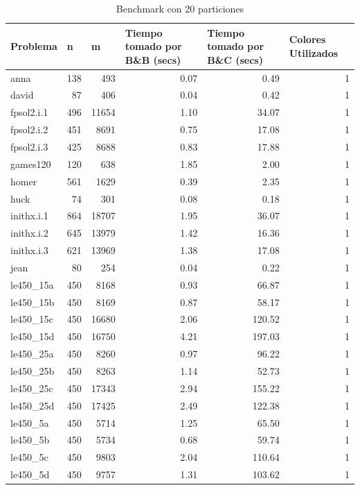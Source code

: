 \begin{table}[H]
\centering
\caption{Benchmark con 20 particiones}
\begin{tabular}{|l|r|r|r|r|r|}
\hline
Problema & \multicolumn{1}{l|}{n} & \multicolumn{1}{l|}{m} & \multicolumn{1}{l|}{Tiempo tomado por B\&B (secs)} & \multicolumn{1}{l|}{Tiempo tomado por B\&C (secs)} & \multicolumn{1}{l|}{Colores Utilizados} \\ \hline
anna & 138 & 493 & 0.07 & 0.49 & 1 \\ \hline
david & 87 & 406 & 0.04 & 0.42 & 1 \\ \hline
fpsol2.i.1 & 496 & 11654 & 1.10 & 34.07 & 1 \\ \hline
fpsol2.i.2 & 451 & 8691 & 0.75 & 17.08 & 1 \\ \hline
fpsol2.i.3 & 425 & 8688 & 0.83 & 17.88 & 1 \\ \hline
games120 & 120 & 638 & 1.85 & 2.00 & 1 \\ \hline
homer & 561 & 1629 & 0.39 & 2.35 & 1 \\ \hline
huck & 74 & 301 & 0.08 & 0.18 & 1 \\ \hline
inithx.i.1 & 864 & 18707 & 1.95 & 36.07 & 1 \\ \hline
inithx.i.2 & 645 & 13979 & 1.42 & 16.36 & 1 \\ \hline
inithx.i.3 & 621 & 13969 & 1.38 & 17.08 & 1 \\ \hline
jean & 80 & 254 & 0.04 & 0.22 & 1 \\ \hline
le450\_15a & 450 & 8168 & 0.93 & 66.87 & 1 \\ \hline
le450\_15b & 450 & 8169 & 0.87 & 58.17 & 1 \\ \hline
le450\_15c & 450 & 16680 & 2.06 & 120.52 & 1 \\ \hline
le450\_15d & 450 & 16750 & 4.21 & 197.03 & 1 \\ \hline
le450\_25a & 450 & 8260 & 0.97 & 96.22 & 1 \\ \hline
le450\_25b & 450 & 8263 & 1.14 & 52.73 & 1 \\ \hline
le450\_25c & 450 & 17343 & 2.94 & 155.22 & 1 \\ \hline
le450\_25d & 450 & 17425 & 2.49 & 122.38 & 1 \\ \hline
le450\_5a & 450 & 5714 & 1.25 & 65.50 & 1 \\ \hline
le450\_5b & 450 & 5734 & 0.68 & 59.74 & 1 \\ \hline
le450\_5c & 450 & 9803 & 2.04 & 110.64 & 1 \\ \hline
le450\_5d & 450 & 9757 & 1.31 & 103.62 & 1 \\ \hline

\end{tabular}
\end{table}
